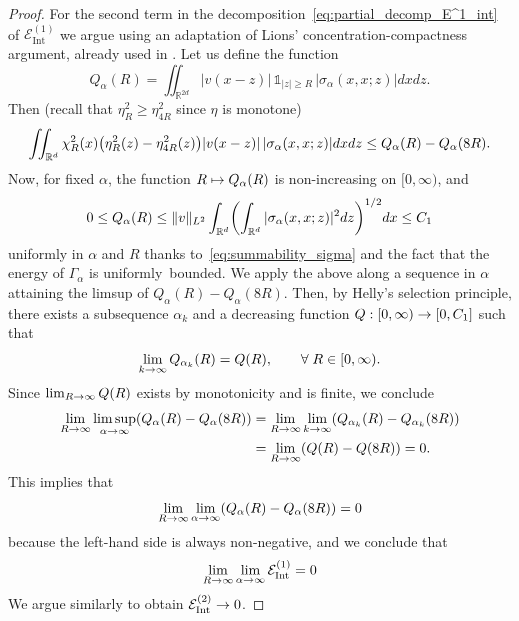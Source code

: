 \documentclass[10pt]{amsart}
\theoremstyle{definition}\newtheorem{defi}[theo]{Definition}\newtheorem{rema}[theo]{Remark}\newtheorem{exam}[theo]{Example}\newtheorem{exem}[theo]{Example}\newtheorem{nota}[theo]{Notation}
\DeclareMathOperator{\Intt}{Int}
\newcommand{\R}{\mathbb{R}}
\newcommand{\cE}{\mathcal{E}}
\newcommand{\1}{\mathds{1}}
\let\oldin\in
\renewcommand{\in}{\mathchoice{\oldin}{\oldin}{\,\oldin\,}{\,\oldin\,}}
\renewcommand*{\to}{\mathchoice{\longrightarrow}{\rightarrow}{\rightarrow}{\rightarrow}}
\let\oldmapsto\mapsto
\renewcommand*{\mapsto}{\mathchoice{\longmapsto}{\oldmapsto}{\oldmapsto}{\oldmapsto}}
\let\originalleft\left
\let\originalright\right
\renewcommand{\left}{\mathopen{}\mathclose\bgroup\originalleft}
\renewcommand{\right}{\aftergroup\egroup\originalright}
\let\oldforall\forall
\renewcommand*{\forall}{\mathrel{\oldforall}}
\begin{document}
\begin{proof}
For the second term in the decomposition~\eqref{eq:partial_decomp_E^1_int} of $\cE^{(1)}_{\Intt}$ we argue using an adaptation of Lions' concentration-compactness argument, already used in \cite[Lemma 4.8]{LewNamRou-14}. Let us define the function
\begin{equation*}
Q_\alpha(R)=\iint_{\R^{2d}} |v(x-z)|\,\1_{|z| \ge R}\, |\sigma_{\alpha}(x,x;z)|dxdz.
\end{equation*}
Then (recall that $\eta_R^2 \ge \eta_{4R}^2$ since $\eta$ is monotone)
\begin{equation*}
\iint_{\R^d} \chi_R^2(x)\left(\eta_R^2(z)- \eta_{4R}^2(z)\right)|v(x-z)|\,|\sigma_{\alpha}(x,x;z)|dxdz \le Q_\alpha(R)-Q_\alpha(8R).
\end{equation*}
Now, for fixed $\alpha$, the function $R\mapsto Q_\alpha(R)$ is non-increasing on $[0,\infty)$, and
\begin{equation*}
0\le Q_\alpha(R) \le \|v\|_{L^2} \int_{\R^d}\left(\int_{\R^d}|\sigma_\alpha(x,x;z)|^2dz \right)^{1/2}dx\le C_1
\end{equation*}
uniformly in $\alpha$ and $R$ thanks to~\eqref{eq:summability_sigma} and the fact that the energy of $\Gamma_\alpha$ is uniformly~bounded. We apply the above along a sequence in $\alpha$ attaining the limsup of $Q_\alpha (R) - Q_\alpha (8R)$. Then, by Helly's selection principle, there exists a subsequence $\alpha_k$ and a decreasing function $Q:[0,\infty)\to [0,C_1]$ such that
\begin{equation*}
\lim_{k\to\infty} Q_{\alpha_k}(R)=Q(R),\qquad\forall R \in[0,\infty).
\end{equation*}
Since $\lim_{R\to\infty} Q(R)$ exists by monotonicity and is finite, we conclude
\begin{align*}
\lim_{R \to\infty} \limsup_{\alpha \to \infty}\left(Q_{\alpha}(R)- Q_{\alpha}(8R) \right) &= \lim_{R \to\infty} \lim_{k \to \infty}\left(Q_{\alpha_k}(R)- Q_{\alpha_k}(8R) \right)\\
&=\lim_{R\to\infty}\left(Q(R)-Q(8R) \right)=0.
\end{align*}
This implies that
\[
\lim_{R \to\infty} \lim_{\alpha \to \infty}\left(Q_{\alpha}(R)- Q_{\alpha}(8R) \right) = 0
\]
because the left-hand side is always non-negative, and we conclude that
\begin{equation*}
\lim_{R \to\infty}\lim_{\alpha\to\infty}\cE^{(1)}_{\Intt}=0
\end{equation*}
We argue similarly to obtain $\cE_{\Intt}^{(2)} \to 0$.
\end{proof}
\end{document}
